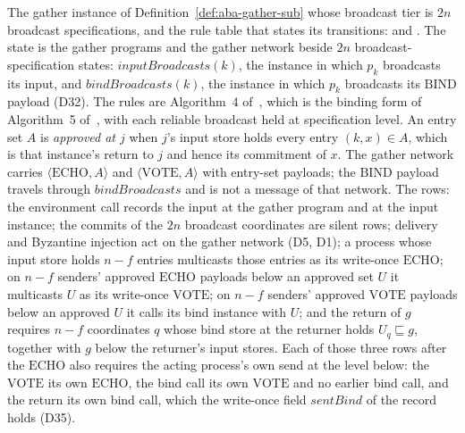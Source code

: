 \begin{definition}
  \label{def:aba-gather-ideal}
  \leanok
  The gather instance of Definition~\ref{def:aba-gather-sub} whose broadcast tier is $2n$ broadcast specifications, and the rule table that states its transitions:  and .
  The state is the gather programs and the gather network beside $2n$ broadcast-specification states: $\mathit{inputBroadcasts}(k)$, the instance in which $p_k$ broadcasts its input, and $\mathit{bindBroadcasts}(k)$, the instance in which $p_k$ broadcasts its $\mathrm{BIND}$ payload (D32).
  The rules are Algorithm~4 of~\cite{LeslieBP}, which is the binding form of Algorithm~5 of~\cite{AFW25}, with each reliable broadcast held at specification level.
  An entry set $A$ is \emph{approved at $j$} when $j$'s input store holds every entry $(k, x) \in A$, which is that instance's return to $j$ and hence its commitment of $x$.
  The gather network carries $\langle\mathrm{ECHO}, A\rangle$ and $\langle\mathrm{VOTE}, A\rangle$ with entry-set payloads; the $\mathrm{BIND}$ payload travels through $\mathit{bindBroadcasts}$ and is not a message of that network.
  The rows: the environment call records the input at the gather program and at the input instance; the commits of the $2n$ broadcast coordinates are silent rows; delivery and Byzantine injection act on the gather network (D5, D1); a process whose input store holds $n{-}f$ entries multicasts those entries as its write-once $\mathrm{ECHO}$; on $n{-}f$ senders' approved $\mathrm{ECHO}$ payloads below an approved set $U$ it multicasts $U$ as its write-once $\mathrm{VOTE}$; on $n{-}f$ senders' approved $\mathrm{VOTE}$ payloads below an approved $U$ it calls its bind instance with $U$; and the return of $g$ requires $n{-}f$ coordinates $q$ whose bind store at the returner holds $U_q \sqsubseteq g$, together with $g$ below the returner's input stores.
  Each of those three rows after the $\mathrm{ECHO}$ also requires the acting process's own send at the level below: the $\mathrm{VOTE}$ its own $\mathrm{ECHO}$, the bind call its own $\mathrm{VOTE}$ and no earlier bind call, and the return its own bind call, which the write-once field $\mathit{sentBind}$ of the record holds (D35).

\end{definition}
